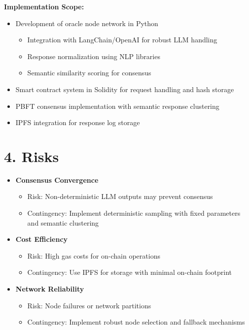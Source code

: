 \documentclass[12pt]{article}
\begin{document}
\textbf{Implementation Scope:}
\begin{itemize}
    \item Development of oracle node network in Python
        \begin{itemize}
            \item Integration with LangChain/OpenAI for robust LLM handling
            \item Response normalization using NLP libraries
            \item Semantic similarity scoring for consensus
        \end{itemize}
    \item Smart contract system in Solidity for request handling and hash storage
    \item PBFT consensus implementation with semantic response clustering
    \item IPFS integration for response log storage
\end{itemize}

\section*{4. Risks}
\begin{itemize}
    \item \textbf{Consensus Convergence}
        \begin{itemize}
            \item Risk: Non-deterministic LLM outputs may prevent consensus
            \item Contingency: Implement deterministic sampling with fixed parameters and semantic clustering
        \end{itemize}
    \item \textbf{Cost Efficiency}
        \begin{itemize}
            \item Risk: High gas costs for on-chain operations
            \item Contingency: Use IPFS for storage with minimal on-chain footprint
        \end{itemize}
    \item \textbf{Network Reliability}
        \begin{itemize}
            \item Risk: Node failures or network partitions
            \item Contingency: Implement robust node selection and fallback mechanisms
        \end{itemize}
\end{itemize}
\end{document}

